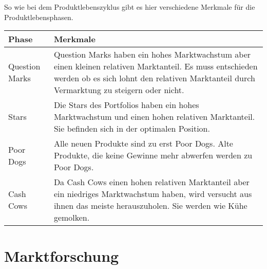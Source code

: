 \begin{flushleft}
    So wie bei dem Produktlebenszyklus gibt es hier verschiedene Merkmale für die Produktlebensphasen.
\end{flushleft}
\begin{center}
\begin{tabular}{|l|p{8cm}|}
    \hline
    \textbf{Phase} & \textbf{Merkmale} \\
    \hline
    Question Marks & Question Marks haben ein hohes Marktwachstum aber einen kleinen relativen Marktanteil. Es muss entschieden werden ob es sich lohnt den relativen Marktanteil durch Vermarktung zu steigern oder nicht. \\
    \hline
    Stars & Die Stars des Portfolios haben ein hohes Marktwachstum und einen hohen relativen Marktanteil. Sie befinden sich in der optimalen Position. \\
    \hline
    Poor Dogs & Alle neuen Produkte sind zu erst Poor Dogs. Alte Produkte, die keine Gewinne mehr abwerfen werden zu Poor Dogs. \\
    \hline
    Cash Cows & Da Cash Cows einen hohen relativen Marktanteil aber ein niedriges Marktwachstum haben, wird versucht aus ihnen das meiste herauszuholen. Sie werden wie Kühe gemolken. \\
    \hline
\end{tabular}
\end{center}

\section{Marktforschung}